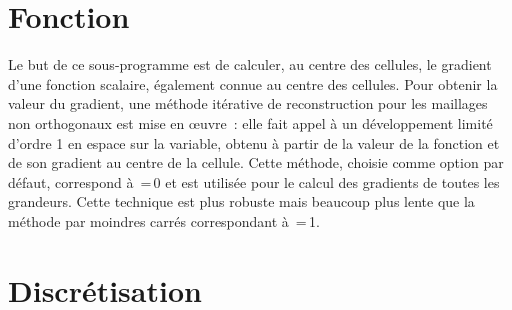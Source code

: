 %
%
%
%
%
%
%
%


\vspace{1cm}
\section{Fonction}

Le but de ce sous-programme est de calculer, au centre des cellules, le gradient
d'une fonction scalaire, \'egalement connue au centre des cellules.
Pour obtenir la valeur du gradient, une m\'ethode it\'erative de
reconstruction pour les maillages non orthogonaux est mise en
\oe uvre~: elle fait appel \`a un d\'eveloppement limit\'e d'ordre 1 en espace
sur la variable, obtenu \`a partir de la
valeur de la fonction et de son gradient au centre de la cellule. Cette
m\'ethode,
choisie comme option par d\'efaut, correspond \`a \,=\,0 et est utilis\'ee pour le calcul
des gradients de toutes les grandeurs. Cette technique est plus robuste mais beaucoup plus lente que la m\'ethode
 par moindres carr\'es correspondant \`a \,=\,1.

\section{Discr\'etisation}

